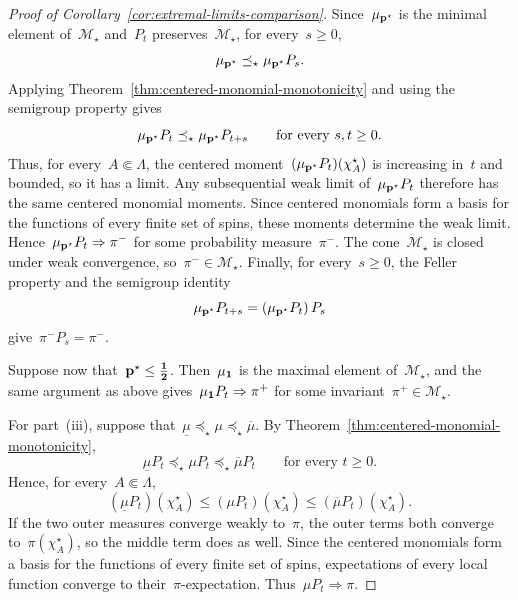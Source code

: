\documentclass[EJP,preprint,NODS,nobera]{ejpecp}
\begin{document}
\begin{proof}[Proof of Corollary~\ref{cor:extremal-limits-comparison}]
Since~$\mu_{\mathbf{p}^\star}$ is the minimal element of~$\mathcal M_\star$ and~$P_t$ preserves~$\mathcal M_\star$, for every~$s\geq0$,
\begin{equation*}
\mu_{\mathbf{p}^\star}
\preceq_\star
\mu_{\mathbf{p}^\star}P_s.
\end{equation*}
Applying Theorem~\ref{thm:centered-monomial-monotonicity} and using the
semigroup property gives
\begin{equation*}
\mu_{\mathbf{p}^\star}P_t
\preceq_\star
\mu_{\mathbf{p}^\star}P_{t+s}
\qquad
\text{for every }s,t\geq0.
\end{equation*}
Thus, for every~$A\Subset\Lambda$, the centered moment~$(\mu_{\mathbf{p}^\star}P_t)(\chi_A^\star)$ is increasing in~$t$ and bounded,
so it has a limit. Any subsequential weak limit of~$\mu_{\mathbf{p}^\star}P_t$ therefore has the same centered monomial moments.
Since centered monomials form a basis for the functions of every finite set of
spins, these moments determine the weak limit. Hence~$\mu_{\mathbf{p}^\star}P_t\Rightarrow\pi^-$ for some probability measure~$\pi^-$. The cone~$\mathcal M_\star$ is closed under weak convergence, so~$\pi^-\in\mathcal M_\star$. Finally, for every~$s\geq0$, the Feller
property and the semigroup identity
\begin{equation*}
\mu_{\mathbf{p}^\star}P_{t+s}
=
\left(\mu_{\mathbf{p}^\star}P_t\right)P_s
\end{equation*}
give~$\pi^-P_s=\pi^-$.

Suppose now that~$\mathbf{p}^\star\leq\boldsymbol{\tfrac12}$. Then~$\mu_{\mathbf{1}}$ is
the maximal element of~$\mathcal M_\star$, and the same
argument as above gives~$\mu_{\mathbf{1}}P_t\Rightarrow\pi^+$ for some invariant~$\pi^+\in\mathcal M_\star$.

For part~\textup{(iii)}, suppose that~$\underline\mu\preceq_\star\mu\preceq_\star\overline\mu$. By
Theorem~\ref{thm:centered-monomial-monotonicity},
\begin{equation*}
\underline\mu P_t
\preceq_\star
\mu P_t
\preceq_\star
\overline\mu P_t
\qquad
\text{for every }t\geq0.
\end{equation*}
Hence, for every~$A\Subset\Lambda$,
\begin{equation*}
(\underline\mu P_t)(\chi_A^\star)
\leq
(\mu P_t)(\chi_A^\star)
\leq
(\overline\mu P_t)(\chi_A^\star).
\end{equation*}
If the two outer measures converge weakly to~$\pi$, the outer terms both
converge to~$\pi(\chi_A^\star)$, so the middle term does as well. Since the
centered monomials form a basis for the functions of every finite set of spins,
expectations of every local function converge to their~$\pi$-expectation.
Thus~$\mu P_t\Rightarrow\pi$.
\end{proof}
\end{document}
